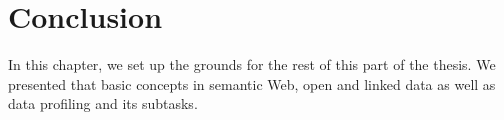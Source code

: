 \section{Conclusion}

In this chapter, we set up the grounds for the rest of this part of the thesis. We presented that basic concepts in semantic Web, open and linked data as well as data profiling and its subtasks.
